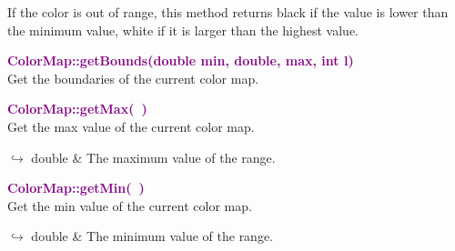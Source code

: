 \begin{tcolorbox}[width=\textwidth,myArgs,tabularx={ll|R}]


\end{tcolorbox}

If the color is out of range, this method returns black if the value is lower than the minimum value, white if it is larger than the highest value.

\textcolor{purple}{\textbf{ColorMap::getBounds(double min, double, max, int l)}}\label{ColorMap::getBounds(double min, double, max, int l)}\\
Get the boundaries of the current color map.

\begin{tcolorbox}[width=\textwidth,myArgs,tabularx={ll|R}]



\end{tcolorbox}


\textcolor{purple}{\textbf{ColorMap::getMax(~)}}\label{ColorMap::getMax()}\\
Get the max value of the current color map.\vspace*{-0.5em}
\begin{tcolorbox}[grow to left by=-1cm, width=\textwidth-1cm,myArgs,tabularx={l|R}]
$\hookrightarrow$ double & The maximum value of the range.
\end{tcolorbox}


\textcolor{purple}{\textbf{ColorMap::getMin(~)}}\label{ColorMap::getMin()}\\
Get the min value of the current color map.\vspace*{-0.5em}
\begin{tcolorbox}[grow to left by=-1cm, width=\textwidth-1cm,myArgs,tabularx={l|R}]
$\hookrightarrow$ double & The minimum value of the range.
\end{tcolorbox}


